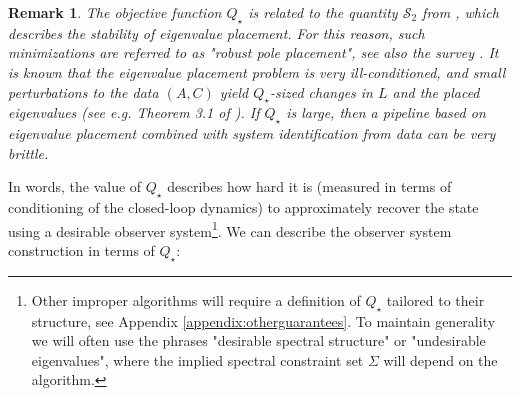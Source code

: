 \documentclass[11pt]{article}
\newcommand{\evannote}[1]{\textcolor{red}{\{evan: #1\}}}
\newtheorem{remark}[theorem]{Remark}
\numberwithin{equation}{section}
\begin{document}
\begin{remark}
The objective function $Q_\star$ is related to the quantity $\mathcal{S}_2$ from \cite{robustpoleplacement}, which describes the stability of eigenvalue placement. For this reason, such minimizations are referred to as "robust pole placement", see also the survey \cite{luenbergeroptimization}. It is known that the eigenvalue placement problem is very ill-conditioned, and small perturbations to the data $(A, C)$ yield $Q_\star$-sized changes in $L$ and the placed eigenvalues (see e.g. Theorem 3.1 of \cite{Mehrmann1996}). If $Q_\star$ is large, then a pipeline based on eigenvalue placement combined with system identification from data can be very brittle.
\end{remark}
In words, the value of $Q_\star$ describes how hard it is (measured in terms of conditioning of the closed-loop dynamics) to approximately recover the state using a desirable observer system\footnote{
Other improper algorithms will require a definition of $Q_\star$ tailored to their structure, see Appendix \ref{appendix:otherguarantees}. To maintain generality we will often use the phrases "desirable spectral structure" or "undesirable eigenvalues", where the implied spectral constraint set $\Sigma$ will depend on the algorithm.}.
We can describe the observer system construction in terms of $Q_\star$:
\end{document}
